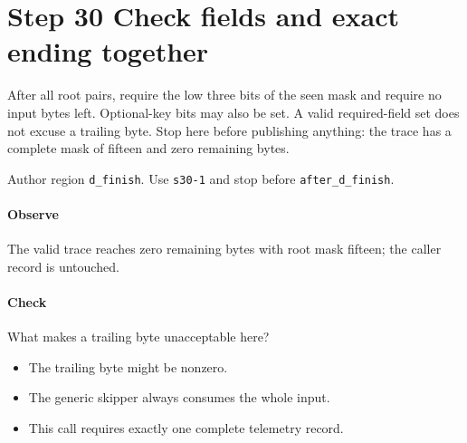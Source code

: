 \section{Step 30 Check fields and exact ending together}\label{cbor-s30}
After all root pairs, require the low three bits of the seen mask and require no input bytes left. Optional-key bits may also be set. A valid required-field set does not excuse a trailing byte. Stop here before publishing anything: the trace has a complete mask of fifteen and zero remaining bytes.

Author region \texttt{d\_finish}. Use \texttt{s30-1} and stop before \texttt{after\_d\_finish}.

\paragraph{Observe} The valid trace reaches zero remaining bytes with root mask fifteen; the caller record is untouched.

\paragraph{Check} What makes a trailing byte unacceptable here?
\begin{itemize}
  \item[A.] The trailing byte might be nonzero.
  \item[B.] The generic skipper always consumes the whole input.
  \item[C.] This call requires exactly one complete telemetry record.
\end{itemize}
